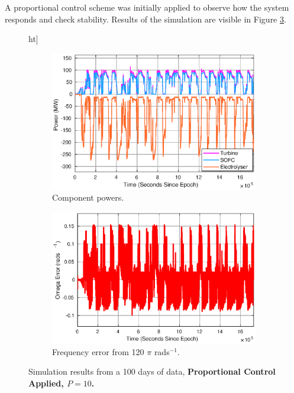 A proportional control scheme was initially applied to observe how the system responds and check stability.
Results of the simulation are visible in Figure \ref{fig:power-proportional}.

\begin{figure}[]ht]
\centering
\begin{subfigure}{.5\textwidth}
  \centering
  \includegraphics[width=1\linewidth]{images/results/P/use.eps}
  \caption{Component powers.}
  \label{fig:sub1}
\end{subfigure}%
\begin{subfigure}{.5\textwidth}
  \centering
  \includegraphics[width=1\linewidth]{images/results/P/omega.eps}
  \caption{Frequency error from 120 $\pi$ rads$^{-1}$.}
  \label{fig:sub2}
\end{subfigure}
\caption{Simulation results from a 100 days of data, {\bf Proportional Control Applied, $P=10$.}}
\label{fig:power-proportional}
\end{figure}

